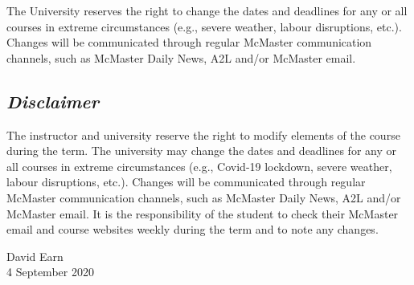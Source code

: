 \documentclass[12pt]{article}
\begin{document}
The University reserves the right to change the dates and deadlines
for any or all courses in extreme circumstances (e.g., severe weather,
labour disruptions, etc.). Changes will be communicated through
regular McMaster communication channels, such as McMaster Daily News,
A2L and/or McMaster email.

\subsection*{\slshape Disclaimer}
The instructor and university reserve the right to modify elements of the course during the term. The university may change the dates and deadlines for any or all courses in extreme circumstances (e.g., Covid-19 lockdown, severe weather, labour disruptions, etc.). Changes will be communicated through regular McMaster communication channels, such as McMaster Daily News, A2L and/or McMaster email. It is the responsibility of the student to check their McMaster email and course websites weekly during the term and to note any changes.

\bigskip \bigskip
\noindent
David Earn\\
4 September 2020
\end{document}
